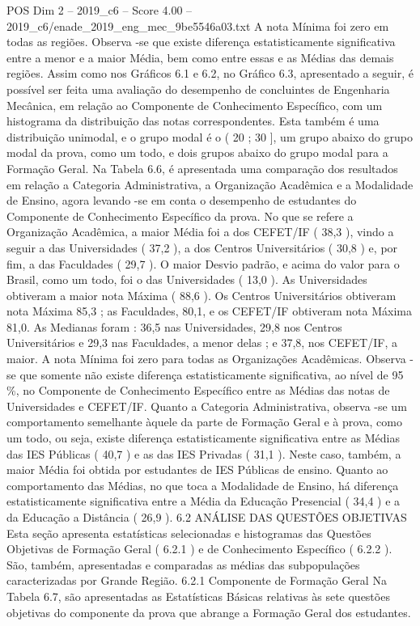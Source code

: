 \begin{textsample}{POS Dim 2 – 2019\_c6 – Score 4.00 – 2019\_c6/enade\_2019\_eng\_mec\_9be5546a03.txt}
A nota Mínima foi zero em todas as regiões.
Observa -se que existe diferença estatisticamente significativa entre a menor e a maior Média, bem como entre essas e as Médias das demais regiões.
Assim como nos Gráficos 6.1 e 6.2, no Gráfico 6.3, apresentado a seguir, é possível ser feita uma avaliação do desempenho de concluintes de Engenharia Mecânica, em relação ao Componente de Conhecimento Específico, com um histograma da distribuição das notas correspondentes.
Esta também é uma distribuição unimodal, e o grupo modal é o ( 20 ; 30 ], um grupo abaixo do grupo modal da prova, como um todo, e dois grupos abaixo do grupo modal para a Formação Geral.
Na Tabela 6.6, é apresentada uma comparação dos resultados em relação a Categoria Administrativa, a Organização Acadêmica e a Modalidade de Ensino, agora levando -se em conta o desempenho de estudantes do Componente de Conhecimento Específico da prova.
No que se refere a Organização Acadêmica, a maior Média foi a dos CEFET/IF ( 38,3 ), vindo a seguir a das Universidades ( 37,2 ), a dos Centros Universitários ( 30,8 ) e, por fim, a das Faculdades ( 29,7 ).
O maior Desvio padrão, e acima do valor para o Brasil, como um todo, foi o das Universidades ( 13,0 ).
As Universidades obtiveram a maior nota Máxima ( 88,6 ).
Os Centros Universitários obtiveram nota Máxima 85,3 ; as Faculdades, 80,1, e os CEFET/IF obtiveram nota Máxima 81,0.
As Medianas foram : 36,5 nas Universidades, 29,8 nos Centros Universitários e 29,3 nas Faculdades, a menor delas ; e 37,8, nos CEFET/IF, a maior.
A nota Mínima foi zero para todas as Organizações Acadêmicas.
Observa -se que somente não existe diferença estatisticamente significativa, ao nível de 95 \%, no Componente de Conhecimento Específico entre as Médias das notas de Universidades e CEFET/IF.
Quanto a Categoria Administrativa, observa -se um comportamento semelhante àquele da parte de Formação Geral e à prova, como um todo, ou seja, existe diferença estatisticamente significativa entre as Médias das IES Públicas ( 40,7 ) e as das IES Privadas ( 31,1 ).
Neste caso, também, a maior Média foi obtida por estudantes de IES Públicas de ensino.
Quanto ao comportamento das Médias, no que toca a Modalidade de Ensino, há diferença estatisticamente significativa entre a Média da Educação Presencial ( 34,4 ) e a da Educação a Distância ( 26,9 ). 6.2 ANÁLISE DAS QUESTÕES OBJETIVAS Esta seção apresenta estatísticas selecionadas e histogramas das Questões Objetivas de Formação Geral ( 6.2.1 ) e de Conhecimento Específico ( 6.2.2 ).
São, também, apresentadas e comparadas as médias das subpopulações caracterizadas por Grande Região. 6.2.1 Componente de Formação Geral Na Tabela 6.7, são apresentadas as Estatísticas Básicas relativas às sete questões objetivas do componente da prova que abrange a Formação Geral dos estudantes.

\end{textsample}
